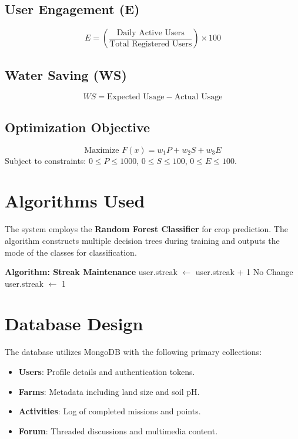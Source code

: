 \documentclass[journal]{IEEEtran}
\begin{document}
\subsection{User Engagement (E)}
\begin{equation}
E = \left( \frac{\text{Daily Active Users}}{\text{Total Registered Users}} \right) \times 100
\end{equation}

\subsection{Water Saving (WS)}
\begin{equation}
WS = \text{Expected Usage} - \text{Actual Usage}
\end{equation}

\subsection{Optimization Objective}
\begin{equation}
\text{Maximize } F(x) = w_1P + w_2S + w_3E
\end{equation}
Subject to constraints: $0 \leq P \leq 1000$, $0 \leq S \leq 100$, $0 \leq E \leq 100$.

\section{Algorithms Used}
The system employs the \textbf{Random Forest Classifier} for crop prediction. The algorithm constructs multiple decision trees during training and outputs the mode of the classes for classification. 

\begin{algorithmic}
\STATE \textbf{Algorithm: Streak Maintenance}
    \STATE user.streak $\leftarrow$ user.streak + 1
    \STATE No Change
\ELSE
    \STATE user.streak $\leftarrow$ 1
\ENDIF
\end{algorithmic}

\section{Database Design}
The database utilizes MongoDB with the following primary collections:
\begin{itemize}
    \item \textbf{Users}: Profile details and authentication tokens.
    \item \textbf{Farms}: Metadata including land size and soil pH.
    \item \textbf{Activities}: Log of completed missions and points.
    \item \textbf{Forum}: Threaded discussions and multimedia content.
\end{itemize}
\end{document}
